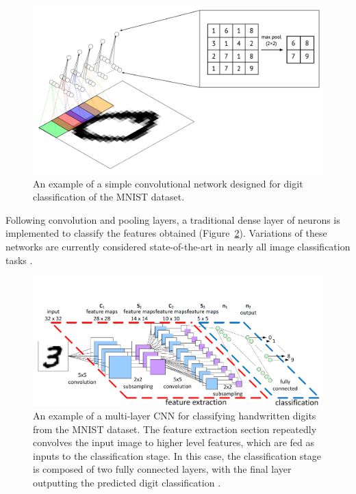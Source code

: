 \documentclass[12pt,oneside,onecolumn,a4paper]{article}
\begin{document}
\begin{figure}[H]
\begin{center}
\includegraphics[width=0.8\columnwidth]{figures/convnet}
\caption{An example of a simple convolutional network designed for digit classification of the MNIST dataset. \label{fig:convolutional_mnist}}%
\end{center}
\end{figure}

Following convolution and pooling layers, a traditional dense layer of neurons is implemented to classify the features obtained (Figure~\ref{fig:mnist_full}). Variations of these networks are currently considered state-of-the-art in nearly all image classification tasks \citep{Koushik2016UnderstandingCN}.

\begin{figure}[H]
\begin{center}
\includegraphics[width=0.8\columnwidth]{figures/CNN/CNN}
\caption{An example of a multi-layer CNN for classifying handwritten digits from the MNIST dataset. The feature extraction section repeatedly convolves the input image to higher level features, which are fed as inputs to the classification stage. In this case, the classification stage is composed of two fully connected layers, with the final layer outputting the predicted digit classification \citep{peemen_mesman_corporaal_2011}. \label{fig:mnist_full}%
}
\end{center}
\end{figure}
\end{document}
